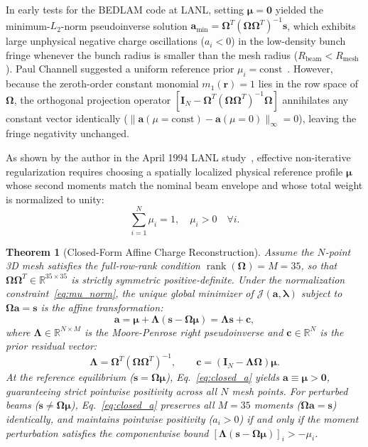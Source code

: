 \documentclass[11pt,a4paper]{article}
\newcommand{\bOmega}{\mathbf{\Omega}}
\newcommand{\bLambda}{\mathbf{\Lambda}}
\newtheorem{theorem}{Theorem}
\begin{document}
In early tests for the BEDLAM code at LANL, setting $\bm{\mu} = \bm{0}$ yielded the minimum-$L_2$-norm pseudoinverse solution $\bm{a}_{\min} = \bOmega^T (\bOmega\bOmega^T)^{-1} \bm{s}$, which exhibits large unphysical negative charge oscillations ($a_i < 0$) in the low-density bunch fringe whenever the bunch radius is smaller than the mesh radius ($R_{\mathrm{beam}} < R_{\mathrm{mesh}}$). Paul Channell suggested a uniform reference prior $\mu_i = \mathrm{const}$~\cite{channell1993moment}. However, because the zeroth-order constant monomial $m_1(\bm{r}) = 1$ lies in the row space of $\bOmega$, the orthogonal projection operator $[\bm{I}_N - \bOmega^T(\bOmega\bOmega^T)^{-1}\bOmega]$ annihilates any constant vector identically ($\|\bm{a}(\mu=\mathrm{const}) - \bm{a}(\mu=0)\|_\infty = 0$), leaving the fringe negativity unchanged.

As shown by the author in the April 1994 LANL study~\cite{ahn1994preliminary}, effective non-iterative regularization requires choosing a spatially localized physical reference profile $\bm{\mu}$ whose second moments match the nominal beam envelope and whose total weight is normalized to unity:
\begin{equation}
    \sum_{i=1}^N \mu_i = 1, \quad \mu_i > 0 \quad \forall i.
    \label{eq:mu_norm}
\end{equation}

\begin{theorem}[Closed-Form Affine Charge Reconstruction]
\label{thm:charge_inversion}
Assume the $N$-point 3D mesh satisfies the full-row-rank condition $\operatorname{rank}(\bOmega) = M = 35$, so that $\bOmega\bOmega^T \in \mathbb{R}^{35 \times 35}$ is strictly symmetric positive-definite. Under the normalization constraint~\eqref{eq:mu_norm}, the unique global minimizer of $\mathcal{J}(\bm{a}, \bm{\lambda})$ subject to $\bOmega\bm{a} = \bm{s}$ is the affine transformation:
\begin{equation}
    \bm{a} = \bm{\mu} + \bLambda (\bm{s} - \bOmega \bm{\mu}) = \bLambda \bm{s} + \bm{c},
    \label{eq:closed_a}
\end{equation}
where $\bLambda \in \mathbb{R}^{N \times M}$ is the Moore-Penrose right pseudoinverse and $\bm{c} \in \mathbb{R}^N$ is the prior residual vector:
\begin{equation}
    \bLambda = \bOmega^T (\bOmega \bOmega^T)^{-1}, \qquad \bm{c} = (\bm{I}_N - \bLambda \bOmega)\bm{\mu}.
    \label{eq:lambda_matrix}
\end{equation}
At the reference equilibrium ($\bm{s} = \bOmega \bm{\mu}$), Eq.~\eqref{eq:closed_a} yields $\bm{a} \equiv \bm{\mu} > \bm{0}$, guaranteeing strict pointwise positivity across all $N$ mesh points. For perturbed beams ($\bm{s} \ne \bOmega\bm{\mu}$), Eq.~\eqref{eq:closed_a} preserves all $M=35$ moments ($\bOmega\bm{a} = \bm{s}$) identically, and maintains pointwise positivity ($a_i > 0$) if and only if the moment perturbation satisfies the componentwise bound $[\bLambda(\bm{s} - \bOmega\bm{\mu})]_i > -\mu_i$.
\end{theorem}
\end{document}
